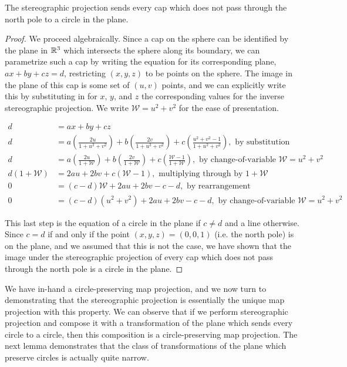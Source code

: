 \begin{lemma}
  The stereographic projection sends every cap which does not pass through the north pole to a circle in the plane.
\end{lemma}
\begin{proof}
  We proceed algebraically.  Since a cap on the sphere can be
  identified by the plane in $\mathbb{R}^3$ which intersects the sphere along
  its boundary, we can parametrize such a cap by writing the equation
  for its corresponding plane, $ax+by+cz=d$, restricting $(x,y,z)$ to
  be points on the sphere.  The image in the plane of this cap is some
  set of $(u,v)$ points, and we can explicitly write this by
  substituting in for $x$, $y$, and $z$ the corresponding values for
  the inverse stereographic projection.  We write
  $\mathcal{W}=u^2+v^2$ for the ease of presentation. 

  \begin{align*}
    d&=ax+by+cz\\
    d&=a\left(\frac{2u}{1+u^2+v^2}\right)+b\left(\frac{2v}{1+u^2+v^2}\right)+c\left(\frac{u^2+v^2-1}{1+u^2+v^2}\right),
    \text{ by substitution}\\
    d&=a\left(\frac{2u}{1+\mathcal{W}}\right)+b\left(\frac{2v}{1+\mathcal{W}}\right)+c\left(\frac{\mathcal{W}-1}{1+\mathcal{W}}\right),
    \text{ by change-of-variable }\mathcal{W}=u^2+v^2\\
    d\left(1+\mathcal{W}\right)&=2au+2bv+c\left(\mathcal{W}-1\right),
    \text{ multiplying through by }1+\mathcal{W}\\ 0 &=
    (c-d)\mathcal{W} + 2au +2bv - c - d,\text{ by rearrangement}\\
    0 &= (c-d)(u^2+v^2)+2au+2bv - c - d,\text{ by change-of-variable
    } \mathcal{W}=u^2+v^2 
  \end{align*}

  This last step is the equation of a circle in the plane if $c\neq d$
  and a line otherwise.  Since $c=d$ if and only if the point
  $(x,y,z)=(0,0,1)$ (i.e. the north pole) is on the plane, and we
  assumed that this is not the case, we have shown that the image
  under the stereographic projection of every cap which does not pass
  through the north pole is a circle in the plane.

\end{proof}

We have in-hand a circle-preserving map projection, and we now
turn to demonstrating that the stereographic projection is essentially
the unique map projection with this property.  We can observe that if
we perform stereographic projection and compose it with
a transformation of the plane which sends every circle to a circle,
then this composition is a circle-preserving map projection.  The next
lemma demonstrates that the class of transformations of the plane
which preserve circles is actually quite narrow.

